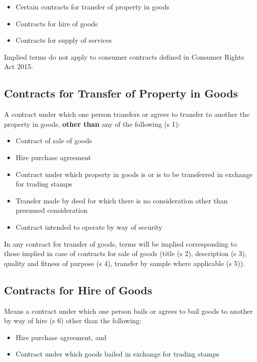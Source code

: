 \documentclass[
]{article}
\providecommand{\tightlist}{%
  \setlength{\itemsep}{0pt}\setlength{\parskip}{0pt}}
\begin{document}
\begin{itemize}
\tightlist
\item
  Certain contracts for transfer of property in goods
\item
  Contracts for hire of goods
\item
  Contracts for supply of services
\end{itemize}

Implied terms do not apply to consumer contracts defined in Consumer
Rights Act 2015.

\hypertarget{contracts-for-transfer-of-property-in-goods}{%
\subsection{Contracts for Transfer of Property in
Goods}\label{contracts-for-transfer-of-property-in-goods}}

A contract under which one person transfers or agrees to transfer to
another the property in goods, \textbf{other than} any of the following
(s 1):

\begin{itemize}
\tightlist
\item
  Contract of sale of goods
\item
  Hire purchase agreement
\item
  Contract under which property in goods is or is to be transferred in
  exchange for trading stamps
\item
  Transfer made by deed for which there is no consideration other than
  presumed consideration
\item
  Contract intended to operate by way of security
\end{itemize}

In any contract for transfer of goods, terms will be implied
corresponding to those implied in case of contracts for sale of goods
(title (s 2), description (s 3), quality and fitness of purpose (s 4),
transfer by sample where applicable (s 5)).

\hypertarget{contracts-for-hire-of-goods}{%
\subsection{Contracts for Hire of
Goods}\label{contracts-for-hire-of-goods}}

Means a contract under which one person bails or agrees to bail goods to
another by way of hire (s 6) other than the following:

\begin{itemize}
\tightlist
\item
  Hire purchase agreement, and
\item
  Contract under which goods bailed in exchange for trading stamps
\end{itemize}
\end{document}
